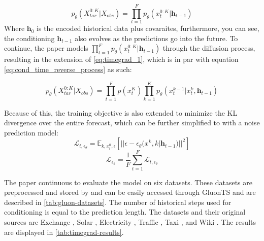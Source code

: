 \begin{equation} \label{eq:timegrad_1}
         p_\theta(X_{tar}^{0:K} | X_{obs}) = \prod_{t=1}^F p_\theta(x_t^{0:K} | \mathbf{h}_{t-1})
\end{equation}
Where $\mathbf{h}_0$ is the encoded historical data plus covaraites, furthermore, you can see, the conditioning $\mathbf{h}_{t-1}$ also evolves as the predictions go into the future. To continue, the paper models $\prod_{t=1}^F p_\theta(x_t^{0:K} | \mathbf{h}_{t-1})$ through the diffusion process, resulting in the extension of \eqref{eq:timegrad_1}, which is in par with equation \eqref{eq:cond_time_reverse_process} as such:

\begin{equation}
         p_\theta(X_{tar}^{0:K} | X_{obs}) = \prod_{t=1}^F p(x_t^K) \prod_{k=1}^K  p_\theta(x_t^{k-1} | x_t^k, \mathbf{h}_{t-1})
\end{equation}

Because of this, the training objective is also extended to minimize the KL divergence over the entire forecast, which can be further simplified to with a noise prediction model:
\begin{equation}
    \mathcal{L}_{t,\epsilon_\theta} = \mathbb{E}_{k, x_t^0, \epsilon} \left[|| \epsilon - \epsilon_\theta(x^k, k | \mathbf{h}_{t-1})||^2 \right]
\end{equation}
\begin{equation}
    \mathcal{L}_{\epsilon_\theta} = \frac{1}{F} \sum_{t=1}^F \mathcal{L}_{t,\epsilon_\theta}
\end{equation}

The paper continuous to evaluate the model on six datasets. These datasets are preprocessed and stored by \textcite{salinas_high-dimensional_2019} and can be easily accessed through GluonTS and are described in \autoref{tab:gluon-datasets}. The number of historical steps used for conditioning is equal to the prediction length. The datasets and their original sources are Exchange \cite{lai_modeling_2018}, Solar \cite{lai_modeling_2018}, Electricity \cite{trindade_electricityloaddiagrams20112014_2015},  Traffic \cite{cuturi_pems-sf_2011}, Taxi \cite{nyc_taxi_and_limousine_commission_tlc_2015}, and Wiki \cite{gasthaus_probabilistic_2019}. The results are displayed in \autoref{tab:timegrad-results}.

